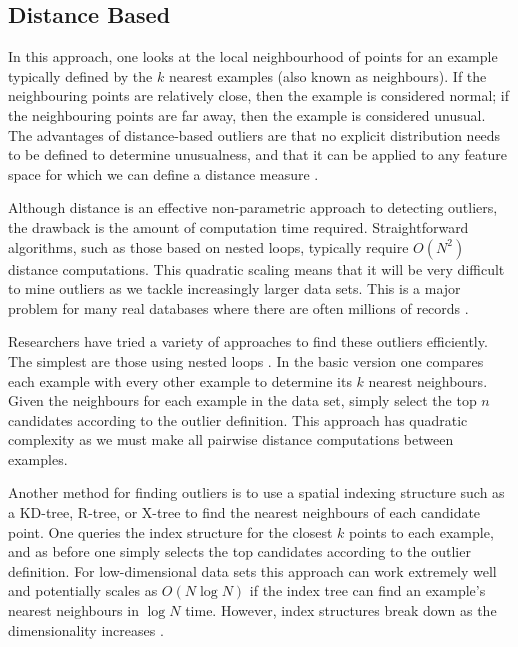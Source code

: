 \subsection{Distance Based}
\label{anomalyDetection:approaches:distance}
In this approach, one looks at the local neighbourhood of points for an example
typically defined by the $k$ nearest examples (also known as neighbours). If the
neighbouring points are relatively close, then the example is considered normal;
if the neighbouring points are far away, then the example is considered unusual.
The advantages of distance-based outliers are that no explicit distribution
needs to be defined to determine unusualness, and that it can be applied to any
feature space for which we can define a distance measure \cite{Bay:2003}.

Although distance is an effective non-parametric approach to detecting outliers,
the drawback is the amount of computation time required. Straightforward
algorithms, such as those based on nested loops, typically require $O(N^2)$
distance computations. This quadratic scaling means that it will be very
difficult to mine outliers as we tackle increasingly larger data sets. This is a
major problem for many real databases where there are often millions of records
\cite{Bay:2003}.

Researchers have tried a variety of approaches to find these outliers
efficiently. The simplest are those using nested loops \cite{Bay:2003}. In the
basic version one compares each example with every other example to determine
its $k$ nearest neighbours. Given the neighbours for each example in the data
set, simply select the top $n$ candidates according to the outlier definition.
This approach has quadratic complexity as we must make all pairwise distance
computations between examples.

Another method for finding outliers is to use a spatial indexing structure such
as a KD-tree, R-tree, or X-tree to find the nearest neighbours of each candidate
point. One queries the index structure for the closest $k$ points to each
example, and as before one simply selects the top candidates according to the
outlier definition. For low-dimensional data sets this approach can work
extremely well and potentially scales as $O(N \log N)$ if the index tree can
find an example's nearest neighbours in $\log N$ time. However, index structures
break down as the dimensionality increases \cite{Bay:2003}.

